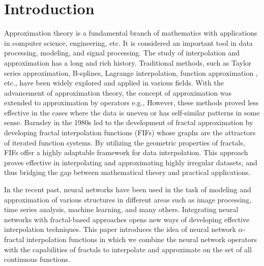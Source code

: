 \documentclass{article}[12pt, a4]
\begin{document}

\maketitle

\section{Introduction}\label{sec1}

Approximation theory is a fundamental branch of mathematics with applications in computer science, engineering, etc. It is considered an important tool in data processing, modeling, and signal processing. The study of interpolation and approximation has a long and rich history. Traditional methods, such as Taylor series approximation, B-splines, Lagrange interpolation, function approximation \cite{ aymanfilomat, cai2023approximation, cai2018shape}, etc., have been widely explored and applied in various fields. With the advancement of approximation theory, the concept of approximation was extended to approximation by operators e.g., \cite{articlekj, khan2021phillips, MURSALEEN2015874, far} However, these methods proved less effective in the cases where the data is uneven or has self-similar patterns in some sense. Barnsley \cite{barnsley1986fractal} in the 1980s led to the development of fractal approximation by developing fractal interpolation functions (FIFs) whose graphs are the attractors of iterated function systems. By utilizing the geometric properties of fractals, FIFs offer a highly adaptable framework for data interpolation. This approach proves effective in interpolating and approximating highly irregular datasets, and thus bridging the gap between mathematical theory and practical applications.

In the recent past, neural networks have been used in the task of modeling and approximation of various structures in different areas such as image processing, time series analysis, machine learning, and many others. Integrating neural networks with fractal-based approaches opens new ways of developing effective interpolation techniques. This paper introduces the idea of neural network \(\alpha\)-fractal interpolation functions in which we combine the neural network operators with the capabilities of fractals to interpolate and approximate on the set of all continuous functions.
\end{document}
